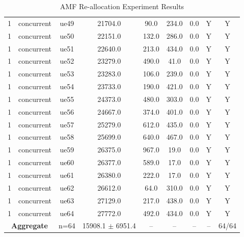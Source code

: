 \begin{table}[ht]
\begin{tabular}{|c|c|c|c|c|c|c|c|c|}
1 & concurrent & ue49 & 21704.0 & 90.0 & 234.0 & 0.0 & Y & Y \\
1 & concurrent & ue50 & 22151.0 & 132.0 & 286.0 & 0.0 & Y & Y \\
1 & concurrent & ue51 & 22640.0 & 213.0 & 434.0 & 0.0 & Y & Y \\
1 & concurrent & ue52 & 23279.0 & 490.0 & 41.0 & 0.0 & Y & Y \\
1 & concurrent & ue53 & 23283.0 & 106.0 & 239.0 & 0.0 & Y & Y \\
1 & concurrent & ue54 & 23733.0 & 190.0 & 421.0 & 0.0 & Y & Y \\
1 & concurrent & ue55 & 24373.0 & 480.0 & 303.0 & 0.0 & Y & Y \\
1 & concurrent & ue56 & 24667.0 & 374.0 & 401.0 & 0.0 & Y & Y \\
1 & concurrent & ue57 & 25279.0 & 612.0 & 435.0 & 0.0 & Y & Y \\
1 & concurrent & ue58 & 25699.0 & 640.0 & 467.0 & 0.0 & Y & Y \\
1 & concurrent & ue59 & 26375.0 & 967.0 & 19.0 & 0.0 & Y & Y \\
1 & concurrent & ue60 & 26377.0 & 589.0 & 17.0 & 0.0 & Y & Y \\
1 & concurrent & ue61 & 26380.0 & 222.0 & 17.0 & 0.0 & Y & Y \\
1 & concurrent & ue62 & 26612.0 & 64.0 & 310.0 & 0.0 & Y & Y \\
1 & concurrent & ue63 & 27129.0 & 217.0 & 438.0 & 0.0 & Y & Y \\
1 & concurrent & ue64 & 27772.0 & 492.0 & 434.0 & 0.0 & Y & Y \\
\multicolumn{2}{|c|}{\textbf{Aggregate}} & n=64 & 15908.1 $\pm$ 6951.4 & -- & -- & -- & -- & 64/64 \\
\hline
\end{tabular}
\caption{AMF Re-allocation Experiment Results}
\label{tab:amf_realloc}
\end{table}
